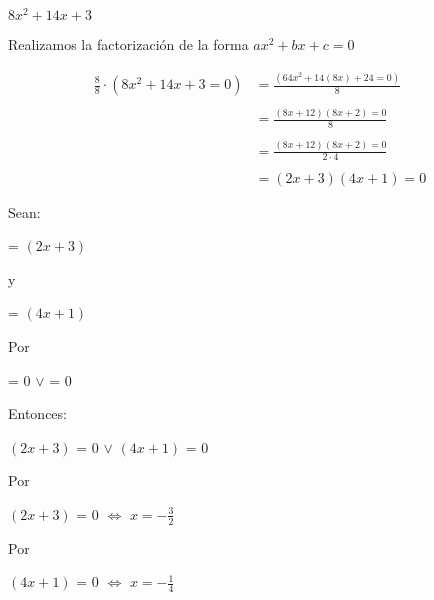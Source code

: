 \documentclass[12pt]{article}
\begin{document}
\begin{center}
    $8x^{2}+14x+3$ 
\end{center} 
    
Realizamos la factorización de la forma $ax^{2} + bx + c = 0$

\begin{equation*}
    \begin{split}
      \frac{8}{8}\cdot(8x^{2}+14x+3 = 0) & = \frac{(64x^{2}+14(8x)+24 = 0)}{8} \\\\
      & = \frac{(8x+12)(8x+2)=0}{8} \\\\
      & = \frac{(8x+12)(8x+2)=0}{2\cdot 4} \\\\
       & = {(2x+3)(4x+1)=0}\\\\
    \end{split}
\end{equation*}
Sean: 
\begin{center}
   {} = $(2x+3)$ 
\end{center}

\begin{center}
    y
\end{center}

\begin{center}
   {} = $(4x+1)$   
\end{center}
    
Por {}
\begin{center}
   {} = $0$  $\vee$ {} = $0$   
\end{center}

Entonces:

\begin{center}
   
   $(2x+3)$ = $0$  $\vee$ $(4x+1)$ = $0$   
   
\end{center}

Por {}

\begin{center}
   
   $(2x+3)$ = $0$ $\Leftrightarrow$ $ x=-\frac{3}{2} $ 
   
\end{center}

Por {}

\begin{center}
   
  $(4x+1)$ = $0$ $\Leftrightarrow$ $ x= -\frac{1}{4}$ 
   
\end{center}
\end{document}
